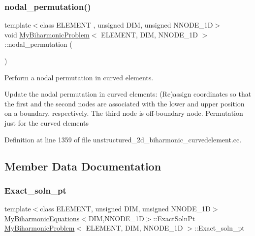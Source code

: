 \subsubsection{\texorpdfstring{nodal\+\_\+permutation()}{nodal\_permutation()}}
{\footnotesize\ttfamily template$<$class E\+L\+E\+M\+E\+NT , unsigned D\+IM, unsigned N\+N\+O\+D\+E\+\_\+1D$>$ \\
void \hyperlink{classMyBiharmonicProblem}{My\+Biharmonic\+Problem}$<$ E\+L\+E\+M\+E\+NT, D\+IM, N\+N\+O\+D\+E\+\_\+1D $>$\+::nodal\+\_\+permutation (\begin{DoxyParamCaption}{ }\end{DoxyParamCaption})}



Perform a nodal permutation in curved elements. 

Update the nodal permutation in curved elements\+: (Re)assign coordinates so that the first and the second nodes are associated with the lower and upper position on a boundary, respectively. The third node is off-\/boundary node. Permutation just for the curved elements 

Definition at line 1359 of file unstructured\+\_\+2d\+\_\+biharmonic\+\_\+curvedelement.\+cc.



\subsection{Member Data Documentation}
\mbox{\label{classMyBiharmonicProblem_a9f681412ab2041bf3ddcd668ee816362}} 
\subsubsection{\texorpdfstring{Exact\+\_\+soln\+\_\+pt}{Exact\_soln\_pt}}
{\footnotesize\ttfamily template$<$class E\+L\+E\+M\+E\+NT, unsigned D\+IM, unsigned N\+N\+O\+D\+E\+\_\+1D$>$ \\
\hyperlink{classoomph_1_1MyBiharmonicEquations}{My\+Biharmonic\+Equations}$<$D\+IM,N\+N\+O\+D\+E\+\_\+1D$>$\+::Exact\+Soln\+Pt \hyperlink{classMyBiharmonicProblem}{My\+Biharmonic\+Problem}$<$ E\+L\+E\+M\+E\+NT, D\+IM, N\+N\+O\+D\+E\+\_\+1D $>$\+::Exact\+\_\+soln\+\_\+pt\hspace{0.3cm}{\ttfamily [private]}}




